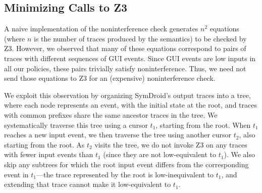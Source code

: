 \documentclass{entcs} \usepackage{entcsmacro}
\newcommand{\comment}[3][\color{red}]{{#1{[{#2}: {#3}]}}}
\newcommand{\kris}[1]{\comment[\color{orange}]{kris}{#1}}
\begin{document}

\subsection{Minimizing Calls to Z3}

A naive implementation of the noninterference check generates $n^2$
equations (where $n$ is the number of traces produced by the semantics)
to be checked by Z3. However, we observed that many of these equations
correspond to pairs of traces with different sequences of GUI
events. Since GUI events are low inputs in all our policies, these
pairs trivially satisfy noninterference. Thus, we need not send those
equations to Z3 for an (expensive) noninterference check.

We exploit this observation by organizing SymDroid's output traces
into a tree, where each node represents an event, with
the initial state at the root, and traces with common prefixes share the
same ancestor traces in the tree. We systematically traverse this tree
using a cursor $t_1$, starting from the root. When $t_1$ reaches a new
input event, we then traverse the tree using another cursor $t_2$,
also starting from the root. As $t_2$ visits the tree, we do not
invoke Z3 on any traces with fewer input events than $t_1$ (since they
are not low-equivalent to $t_1$). We also skip any subtrees for
which the root input event differs from the corresponding event in
$t_1$---the trace represented by the root is low-inequivalent to $t_1$,
and extending that trace cannot make it low-equivalent to $t_1$.

\end{document}
